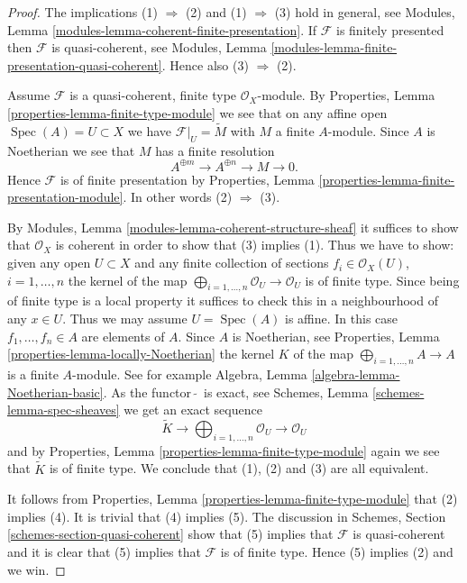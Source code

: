 \documentclass{stacks-project}
\theoremstyle{plain}
\theoremstyle{definition}
\theoremstyle{remark}
\numberwithin{equation}{subsection}
\def\Spec{\mathop{\mathrm{Spec}}}
\begin{document}
\begin{proof}
The implications (1) $\Rightarrow$ (2) and (1) $\Rightarrow$ (3) hold
in general, see
Modules, Lemma \ref{modules-lemma-coherent-finite-presentation}.
If $\mathcal{F}$ is finitely presented then $\mathcal{F}$ is
quasi-coherent, see
Modules, Lemma \ref{modules-lemma-finite-presentation-quasi-coherent}.
Hence also (3) $\Rightarrow$ (2).

\medskip\noindent
Assume $\mathcal{F}$ is a quasi-coherent, finite type $\mathcal{O}_X$-module.
By
Properties, Lemma \ref{properties-lemma-finite-type-module}
we see that on any affine open
$\Spec(A) = U \subset X$ we have $\mathcal{F}|_U = \widetilde M$
with $M$ a finite $A$-module. Since $A$ is Noetherian we see that
$M$ has a finite resolution
$$
A^{\oplus m} \to A^{\oplus n} \to M \to 0.
$$
Hence $\mathcal{F}$ is of finite presentation by
Properties, Lemma \ref{properties-lemma-finite-presentation-module}.
In other words (2) $\Rightarrow$ (3).

\medskip\noindent
By Modules, Lemma \ref{modules-lemma-coherent-structure-sheaf} it suffices
to show that $\mathcal{O}_X$ is coherent in order to show that (3)
implies (1). Thus we have to show: given any open $U \subset X$ and
any finite collection of sections $f_i \in \mathcal{O}_X(U)$,
$i = 1, \ldots, n$ the kernel of the map
$\bigoplus_{i = 1, \ldots, n} \mathcal{O}_U \to \mathcal{O}_U$
is of finite type. Since being of finite type is a local property
it suffices to check this in a neighbourhood of any $x \in U$.
Thus we may assume $U = \Spec(A)$ is affine. In this case
$f_1, \ldots, f_n \in A$ are elements of $A$. Since $A$ is
Noetherian, see
Properties, Lemma \ref{properties-lemma-locally-Noetherian}
the kernel $K$ of the map $\bigoplus_{i = 1, \ldots, n} A \to A$
is a finite $A$-module. See for example
Algebra, Lemma \ref{algebra-lemma-Noetherian-basic}.
As the functor\ $\widetilde{ }$\ is exact, see
Schemes, Lemma \ref{schemes-lemma-spec-sheaves}
we get an exact sequence
$$
\widetilde K \to
\bigoplus\nolimits_{i = 1, \ldots, n} \mathcal{O}_U \to
\mathcal{O}_U
$$
and by
Properties, Lemma \ref{properties-lemma-finite-type-module}
again we see that $\widetilde K$ is of finite type. We conclude
that (1), (2) and (3) are all equivalent.

\medskip\noindent
It follows from
Properties, Lemma \ref{properties-lemma-finite-type-module}
that (2) implies (4). It is trivial that (4) implies (5).
The discussion in
Schemes, Section \ref{schemes-section-quasi-coherent}
show that (5) implies
that $\mathcal{F}$ is quasi-coherent and it is clear that (5)
implies that $\mathcal{F}$ is of finite type. Hence (5) implies
(2) and we win.
\end{proof}
\end{document}
